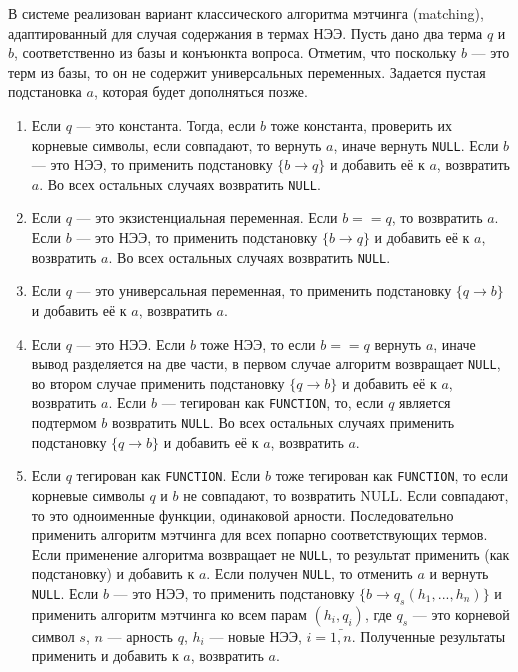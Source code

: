 В системе реализован вариант классического алгоритма мэтчинга (matching), адаптированный для случая содержания в термах НЭЭ. Пусть дано два терма $q$ и $b$, соответственно из базы и конъюнкта вопроса. Отметим, что поскольку $b$ --- это терм из базы, то он не содержит универсальных переменных. Задается пустая подстановка $a$, которая будет дополняться позже.
\begin{enumerate}
\item Если $q$ --- это константа. Тогда, если $b$ тоже константа, проверить их корневые символы, если совпадают, то вернуть $a$, иначе вернуть \texttt{NULL}. Если $b$ --- это НЭЭ, то применить подстановку $\{b \rightarrow q\}$ и добавить её к $a$, возвратить $a$. Во всех остальных случаях возвратить \texttt{NULL}.

\item Если $q$ --- это экзистенциальная переменная. Если $b==q$, то возвратить $a$. Если $b$ --- это НЭЭ, то применить подстановку $\{b \rightarrow q\}$ и добавить её к $a$, возвратить $a$. Во всех остальных случаях возвратить \texttt{NULL}.

\item Если $q$ --- это универсальная переменная, то применить подстановку $\{q \rightarrow b\}$ и добавить её к $a$, возвратить $a$.

\item Если $q$ --- это НЭЭ. Если $b$ тоже НЭЭ, то если $b==q$ вернуть $a$, иначе вывод разделяется на две части, в первом случае алгоритм возвращает \texttt{NULL}, во втором случае применить подстановку $\{q \rightarrow b\}$ и добавить её к $a$, возвратить $a$. Если $b$ --- тегирован как \texttt{FUNCTION}, то, если $q$ является подтермом $b$ возвратить \texttt{NULL}. Во всех остальных случаях применить подстановку $\{q \rightarrow b\}$ и добавить её к $a$, возвратить $a$.

\item Если $q$ тегирован как \texttt{FUNCTION}. Если $b$ тоже тегирован как \texttt{FUNCTION}, то если корневые символы $q$ и $b$ не совпадают, то возвратить NULL. Если совпадают, то это одноименные функции, одинаковой арности. Последовательно применить алгоритм мэтчинга для всех попарно соответствующих термов. Если применение алгоритма возвращает не \texttt{NULL}, то результат применить (как подстановку) и добавить к $a$. Если получен \texttt{NULL}, то отменить $a$ и вернуть \texttt{NULL}. Если $b$ --- это НЭЭ, то применить подстановку $\{b \rightarrow q_s(h_1,...,h_n)\}$ и применить алгоритм мэтчинга ко всем парам $(h_i, q_i)$, где $q_s$ --- это корневой символ $s$, $n$ --- арность $q$, $h_i$ --- новые НЭЭ, $i = \bar{1,n}$. Полученные результаты применить и добавить к  $a$, возвратить $a$.
\end{enumerate}





